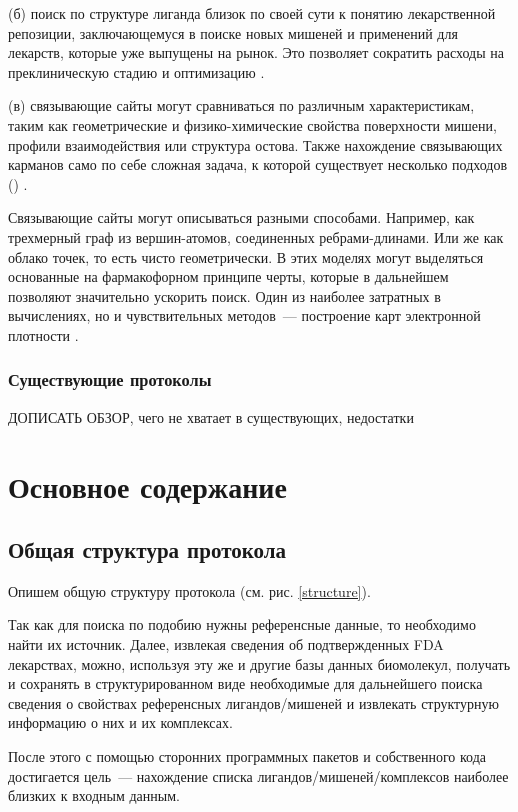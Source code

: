 \documentclass[a4paper,14pt]{article}         %
\newcommand{\sic}[1]{\LARGE\color{orange}{#1}\color{black}\Large}
\begin{document}
(б) поиск по структуре лиганда близок по своей сути к понятию лекарственной репозиции, заключающемуся в поиске новых мишеней и применений для лекарств, которые уже выпущены на рынок. Это позволяет сократить расходы на преклиническую стадию и оптимизацию \cite{Hall2015, March-Vila2017}.

(в) связывающие сайты могут сравниваться по различным характеристикам, таким как геометрические и физико-химические свойства поверхности мишени, профили взаимодействия или структура остова. Также нахождение связывающих карманов само по себе сложная задача, к которой существует несколько подходов (\sic{добавить, как ее решать}) \cite{Ehrt2016}. 

Связывающие сайты могут описываться разными способами. Например, как трехмерный граф из вершин-атомов, соединенных ребрами-длинами. Или же как облако точек, то есть чисто геометрически. В этих моделях могут выделяться основанные на фармакофорном принципе черты, которые в дальнейшем позволяют значительно ускорить поиск. Один из наиболее затратных в вычислениях, но и чувствительных методов~--- построение карт электронной плотности \cite{Ehrt2016}.
\subsubsection{Существующие протоколы}
\color{orange} ДОПИСАТЬ ОБЗОР, чего не хватает в существующих, недостатки\cite{Chartier2017}
\color{black}


\newpage
\section{Основное содержание}
\subsection{Общая структура протокола}
Опишем общую структуру протокола (см. рис. \ref{structure}).

Так как для поиска по подобию нужны референсные данные, то необходимо найти их источник. Далее, извлекая сведения об подтвержденных FDA лекарствах, можно, используя эту же и другие базы данных биомолекул, получать и сохранять в структурированном виде необходимые для дальнейшего поиска сведения о свойствах референсных лигандов/мишеней и извлекать структурную информацию о них и их комплексах.

После этого с помощью сторонних программных пакетов и собственного кода достигается цель~--- нахождение списка лигандов/мишеней/комплексов наиболее близких к входным данным.
\end{document}
